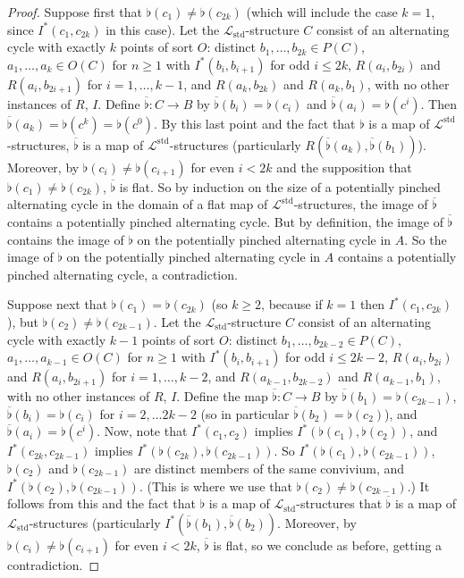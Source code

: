 \documentclass{amsart}
\theoremstyle{definition}
\theoremstyle{remark}
\numberwithin{equation}{section}
\begin{document}
\begin{proof}
    Suppose first that $\flat(c_1) \neq \flat(c_{2k})$ (which will include the case $k =1$, since $I^{*}(c_1, c_{2k})$ in this case). Let the $\mathcal{L}_{\mathrm{std}}$-structure $C$ consist of an alternating cycle with exactly $k$ points of sort $O$: distinct $b_{1}, \ldots, b_{2k} \in P(C)$, $a_1, \ldots, a_k \in O(C)$ for $n \geq 1$ with $I^{*}(b_i, b_{i+1} )$ for odd $i \leq 2k$, $R(a_i, b_{2i})$ and $R(a_i, b_{2i+1})$ for $i= 1, \ldots, k-1$, and $R(a_k, b_{2k})$ and $R(a_k, b_{1})$, with no other instances of $R$, $I$.  Define $\overline{\flat}: C \to B$ by $\overline{\flat}(b_i) = \flat(c_i)$ and $\overline{\flat}(a_i)=\flat(c^{i})$. Then $\overline{\flat}(a_k)= \flat(c^k) = \flat(c^0)$. By this last point and the fact that $\flat$ is a map of $\mathcal{L}^{\mathrm{std}}$-structures, $\overline{\flat}$ is a map of $\mathcal{L}^{\mathrm{std}}$-structures (particularly $R(\overline{\flat}(a_k),\overline{\flat}(b_1) )$). Moreover, by $\flat(c_i) \neq \flat(c_{i+1}) $ for even $i < 2k$ and the supposition that $\flat(c_1) \neq \flat(c_{2k})$, $\overline{\flat}$ is flat. So by induction on the size of a potentially pinched alternating cycle in the domain of a flat map of $\mathcal{L}^{\mathrm{std}}$-structures, the image of $\overline{\flat}$ contains a potentially pinched alternating cycle. But by definition, the image of $\overline{\flat}$ contains the image of $\flat$ on the potentially pinched alternating cycle in $A$. So the image of $\flat$ on the potentially pinched alternating cycle in $A$ contains a potentially pinched alternating cycle, a contradiction.

    Suppose next that $\flat(c_1) = \flat(c_{2k})$ (so $k \geq 2$, because if $k =1$ then $I^{*}(c_1, c_{2k})$), but $\flat(c_2) \neq \flat(c_{2k-1})$.  Let the $\mathcal{L}_{\mathrm{std}}$-structure $C$ consist of an alternating cycle with exactly $k-1$ points of sort $O$: distinct $b_{1}, \ldots, b_{2k-2} \in P(C)$, $a_1, \ldots, a_{k-1} \in O(C)$ for $n \geq 1$ with $I^{*}(b_i, b_{i+1} )$ for odd $i \leq 2k-2$, $R(a_i, b_{2i})$ and $R(a_i, b_{2i+1})$ for $i= 1, \ldots, k-2$, and $R(a_{k-1}, b_{2k-2})$ and $R(a_{k-1}, b_{1})$, with no other instances of $R$, $I$.  Define the map $\overline{\flat}: C \to B$ by $\overline{\flat}(b_1) = \flat(c_{2k-1})$, $\overline{\flat}(b_i) =\flat(c_i)$ for $i = 2, \ldots 2k-2$ (so in particular $\overline{\flat}(b_2) = \flat(c_{2})$), and $\overline{\flat}(a_i) =\flat(c^i)$. Now, note that $I^{*}(c_1, c_2)$ implies $I^{*}(\flat(c_1), \flat(c_2))$, and $I^{*}(c_{2k}, c_{2k-1})$ implies $I^{*}(\flat(c_{2k}), \flat(c_{2k-1}))$. So  $I^{*}(\flat(c_{1}), \flat(c_{2k-1}))$, $\flat(c_2)$ and $\flat(c_{2k-1})$ are distinct members of the same convivium, and $I^{*}(\flat(c_2), \flat(c_{2k-1}))$. (This is where we use that $\flat(c_2) \neq \flat(c_{2k-1})$.)  It follows from this and the fact that $\flat$ is a map of $\mathcal{L}_{\mathrm{std}}$-structures that $\overline{\flat}$ is a map of $\mathcal{L}_{\mathrm{std}}$-structures (particularly $I^{*}(\overline{\flat}(b_1), \overline{\flat}(b_2))$. Moreover,  by $\flat(c_i) \neq \flat(c_{i+1}) $ for even $i < 2k$, $\overline{\flat}$ is flat, so we conclude as before, getting a contradiction.



\end{proof}
\end{document}
